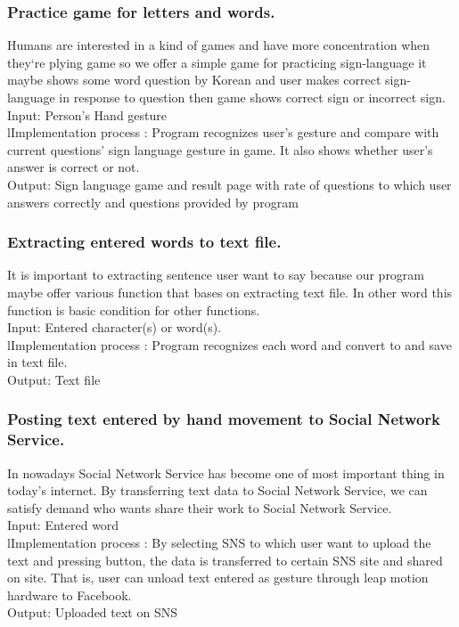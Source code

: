 \documentclass[10pt,journal,compsoc]{IEEEtran}
\begin{document}
\subsubsection{Practice game for letters and words.}

Humans are interested in a kind of games and have more concentration when they`re plying game so we offer a simple game for practicing sign-language it maybe shows some word question by Korean and user makes correct sign-language in response to question then game shows correct sign or incorrect sign.
\\Input: Person's Hand gesture
\\lImplementation process : Program recognizes user’s gesture and compare with current questions’ sign language gesture in game. It also shows whether user’s answer is correct or not.
\\Output: Sign language game and result page with rate of questions to which user answers correctly and questions provided by program


\subsubsection{Extracting entered words to text file.}

It is important to extracting sentence user want to say because our program maybe offer various function that bases on extracting text file. In other word this function is basic condition for other functions.
\\Input: Entered character(s) or word(s).
\\lImplementation process : Program recognizes each word and convert to and save in text file.
\\Output: Text file

\subsubsection{ Posting text entered by hand movement to Social Network Service.}

In nowadays Social Network Service has become one of most important thing in today’s internet. By transferring text data to Social Network Service, we can satisfy demand who wants share their work to Social Network Service.
\\Input: Entered word
\\lImplementation process :  By selecting SNS  to which user want to upload the text and pressing button, the data is transferred to certain SNS site and shared on site. That is, user can unload text entered as gesture through leap motion hardware to Facebook.
\\Output: Uploaded text on SNS
\end{document}
